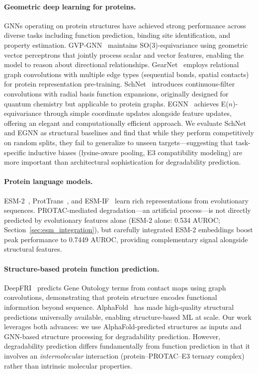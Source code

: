 \documentclass[sigconf]{acmart}
\begin{document}
\paragraph{Geometric deep learning for proteins.}
GNNs operating on protein structures have achieved strong performance across diverse tasks including function prediction, binding site identification, and property estimation.
GVP-GNN~\cite{jing2021gvp} maintains SO(3)-equivariance using geometric vector perceptrons that jointly process scalar and vector features, enabling the model to reason about directional relationships.
GearNet~\cite{zhang2023gearnet} employs relational graph convolutions with multiple edge types (sequential bonds, spatial contacts) for protein representation pre-training.
SchNet~\cite{schutt2017schnet} introduces continuous-filter convolutions with radial basis function expansions, originally designed for quantum chemistry but applicable to protein graphs.
EGNN~\cite{satorras2021egnn} achieves E($n$)-equivariance through simple coordinate updates alongside feature updates, offering an elegant and computationally efficient approach.
We evaluate SchNet and EGNN as structural baselines and find that while they perform competitively on random splits, they fail to generalize to unseen targets---suggesting that task-specific inductive biases (lysine-aware pooling, E3 compatibility modeling) are more important than architectural sophistication for degradability prediction.

\paragraph{Protein language models.}
ESM-2~\cite{lin2023esm2}, ProtTrans~\cite{elnaggar2022prottrans}, and ESM-IF~\cite{hsu2022esmif} learn rich representations from evolutionary sequences.
PROTAC-mediated degradation---an artificial process---is not directly predicted by evolutionary features alone (ESM-2 alone: 0.534 AUROC; Section~\ref{sec:esm_integration}), but carefully integrated ESM-2 embeddings boost peak performance to 0.7449 AUROC, providing complementary signal alongside structural features.

\paragraph{Structure-based protein function prediction.}
DeepFRI~\cite{gligorijevic2021deepfri} predicts Gene Ontology terms from contact maps using graph convolutions, demonstrating that protein structure encodes functional information beyond sequence.
AlphaFold~\cite{jumper2021alphafold} has made high-quality structural predictions universally available, enabling structure-based ML at scale.
Our work leverages both advances: we use AlphaFold-predicted structures as inputs and GNN-based structure processing for degradability prediction.
However, degradability prediction differs fundamentally from function prediction in that it involves an \emph{intermolecular} interaction (protein--PROTAC--E3 ternary complex) rather than intrinsic molecular properties.
\end{document}
